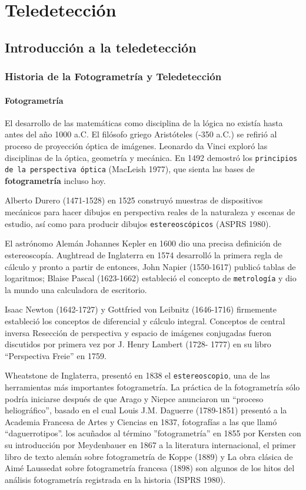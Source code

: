 \chapter{Teledetección}

\section{Introducción a la teledetección}

\subsection{Historia de la Fotogrametría y Teledetección}

\subsubsection{Fotogrametría}

El desarrollo de las matemáticas como disciplina de la lógica
no existía hasta antes del año 1000 a.C.
El filósofo griego Aristóteles (-350 a.C.) se refirió al
proceso de proyección óptica de imágenes. Leonardo
da Vinci exploró las disciplinas de la óptica,
geometría y mecánica. En 1492 demostró
los \texttt{principios de la perspectiva óptica} (MacLeish
1977), que sienta las bases de
\textbf{fotogrametría} incluso hoy. 

Alberto Durero (1471-1528) en 1525 construyó muestras de dispositivos mecánicos
para hacer dibujos en perspectiva reales de la naturaleza
y escenas de estudio, así como para producir
dibujos \texttt{estereoscópicos} (ASPRS 1980).

El astrónomo Alemán Johannes Kepler en 1600 dio una precisa
definición de estereoscopía. Aughtread de Inglaterra en
1574 desarrolló la primera regla de cálculo y pronto
a partir de entonces, John Napier (1550-1617) publicó tablas
de logaritmos; Blaise Pascal (1623-1662)
estableció el concepto de \texttt{metrología} y dio la
mundo una calculadora de escritorio. 

Isaac Newton (1642-1727) y Gottfried von Leibnitz (1646-1716) firmemente
estableció los conceptos de diferencial y
cálculo integral. Conceptos de central inversa
Resección de perspectiva y espacio de imágenes conjugadas 
fueron discutidos por primera vez por J. Henry Lambert (1728-
1777) en su libro ``Perspectiva Freie'' en 1759.

Wheatstone de Inglaterra, presentó en 1838 el \texttt{estereoscopio}, una de las herramientas más importantes fotogrametría. La práctica de la fotogrametría sólo podría iniciarse después de que Arago y Niepce anunciaron un ``proceso heliográfico'', basado en el cual Louis J.M. Daguerre (1789-1851) presentó a la Academia Francesa de Artes y Ciencias en 1837, fotografías a las que llamó ``daguerrotipos''. los acuñados al término ''fotogrametría'' en 1855 por Kersten con su introducción por Meydenbauer en 1867 a la literatura internacional, el primer  libro de texto alemán sobre fotogrametría de Koppe (1889) y  La obra clásica de Aimé Laussedat sobre fotogrametría francesa (1898) son algunos de los hitos del análisis fotogrametría registrada en la historia (ISPRS 1980).


